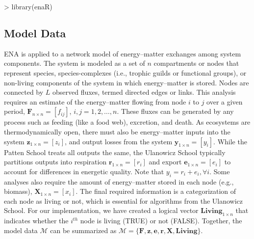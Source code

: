 \documentclass[article]{jss}
\begin{document}
\begin{Schunk}
\begin{Sinput}
> library(enaR)
\end{Sinput}
\end{Schunk}

\subsection{Model Data} \label{sec:data}
ENA is applied to a network model of energy--matter exchanges among
system components.  The system is modeled as a set of $n$ compartments
or nodes that represent species, species-complexes (i.e., trophic
guilds or functional groups), or non-living components of the system
in which energy--matter is stored.  Nodes are connected by $L$
observed fluxes, termed directed edges or links.  This analysis
requires an estimate of the energy--matter flowing from node $i$ to
$j$ over a given period, $\mathbf{F}_{n\times n}=[f_{ij}]$,
$i,j=1,2,\ldots,n$.  These fluxes can be generated by any process such
as feeding (like a food web), excretion, and death.  As ecosystems are
thermodynamically open, there must also be energy--matter inputs into
the system $\mathbf{z}_{1 \times n}=[z_i]$, and output losses from the
system $\mathbf{y}_{1 \times n}=[y_i]$.  While the Patten School treats
all outputs the same, the Ulanowicz School typically partitions
outputs into respiration $\mathbf{r}_{1\times n}=[r_i]$ and export
$\mathbf{e}_{1\times n}=[e_i]$ to account for differences in energetic
quality. Note that $y_i = r_i + e_i, \forall i$.  Some analyses
also require the amount of energy--matter stored in each node (e.g.,
biomass), $\mathbf{X}_{1\times n}=[x_i]$.  The final required
information is a categorization of each node as living or not, which
is essential for algorithms from the Ulanowicz School.  For
our implementation, we have created a logical vector $\mathbf{Living}_{1 \times
  n}$ that indicates whether the $i^{th}$ node is living (TRUE)
or not (FALSE).  Together, the model data $\mathcal{M}$ can be
summarized as $\mathcal{M} =
\{\mathbf{F}, \mathbf{z}, \mathbf{e}, \mathbf{r}, \mathbf{X}, \mathbf{Living}\}$.
\end{document}
